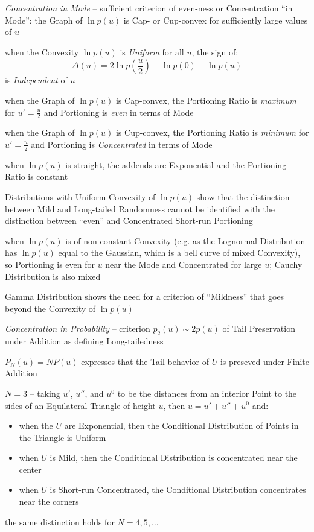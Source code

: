 \emph{Concentration in Mode} -- sufficient criterion of even-ness or
Concentration ``in Mode'': the Graph of $\ln p(u)$ is Cap- or Cup-convex for
sufficiently large values of $u$

when the Convexity $\ln p(u)$ is \emph{Uniform} for all $u$, the sign of:
\[
  \Delta(u) = 2 \ln p(\frac{u}{2}) - \ln p(0) - \ln p(u)
\]
is \emph{Independent} of $u$

when the Graph of $\ln p(u)$ is Cap-convex, the Portioning Ratio is
\emph{maximum} for $u' = \frac{u}{2}$ and Portioning is \emph{even} in terms of
Mode

when the Graph of $\ln p(u)$ is Cup-convex, the Portioning Ratio is
\emph{minimum} for $u' = \frac{u}{2}$ and Portioning is \emph{Concentrated} in
terms of Mode

when $\ln p(u)$ is straight, the addends are Exponential and the Portioning
Ratio is constant

Distributions with Uniform Convexity of $\ln p(u)$ show that the distinction
between Mild and Long-tailed Randomness cannot be identified with the
distinction between ``even'' and Concentrated Short-run Portioning

when $\ln p(u)$ is of non-constant Convexity (e.g. as the Lognormal Distribution
has $\ln p(u)$ equal to the Gaussian, which is a bell curve of mixed Convexity),
so Portioning is even for $u$ near the Mode and Concentrated for large $u$;
Cauchy Distribution is also mixed

\fist Gamma Distribution shows the need for a criterion of ``Mildness'' that
goes beyond the Convexity of $\ln p(u)$

\emph{Concentration in Probability} -- criterion $p_2(u) \sim 2p(u)$ of Tail
Preservation under Addition as defining Long-tailedness

$P_N(u) = NP(u)$ expresses that the Tail behavior of $U$ is preseved under
Finite Addition

$N = 3$ -- taking $u'$, $u''$, and $u^0$ to be the distances from an interior
Point to the sides of an Equilateral Triangle of height $u$, then $u = u' + u''
+ u^0$ and:
\begin{itemize}
  \item when the $U$ are Exponential, then the Conditional Distribution of
    Points in the Triangle is Uniform
  \item when $U$ is Mild, then the Conditional Distribution is concentrated near
    the center
  \item when $U$ is Short-run Concentrated, the Conditional Distribution
    concentrates near the corners
\end{itemize}
the same distinction holds for $N = 4, 5, \ldots$

